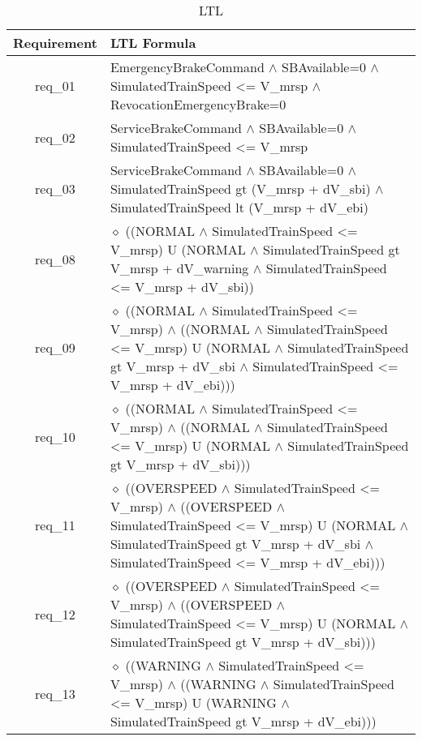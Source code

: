 \begin{table}[ht!]
\footnotesize
	\caption{LTL}
	\begin{center}
    \begin{tabular}{|c|p{10cm}|}
    \hline
	Requirement & LTL Formula \\
	\hline
	\hline
	req\_01 & EmergencyBrakeCommand $\wedge$ SBAvailable=0 $\wedge$ SimulatedTrainSpeed <= V\_mrsp $\wedge$  RevocationEmergencyBrake=0\\
	\hline
	req\_02 & ServiceBrakeCommand $\wedge$ SBAvailable=0 $\wedge$ SimulatedTrainSpeed <= V\_mrsp\\
	\hline
	req\_03 & ServiceBrakeCommand $\wedge$ SBAvailable=0 $\wedge$ SimulatedTrainSpeed gt (V\_mrsp + dV\_sbi) $\wedge$ SimulatedTrainSpeed lt (V\_mrsp + dV\_ebi) \\
	\hline
	req\_08 &  $\diamond$ ((NORMAL	 $\wedge$ SimulatedTrainSpeed <= V\_mrsp) U (NORMAL $\wedge$ SimulatedTrainSpeed gt V\_mrsp + dV\_warning $\wedge$ SimulatedTrainSpeed <= V\_mrsp + dV\_sbi)) \\
	\hline
	req\_09 & $\diamond$ ((NORMAL $\wedge$ SimulatedTrainSpeed <= V\_mrsp) $\wedge$ ((NORMAL $\wedge$ SimulatedTrainSpeed <= V\_mrsp) U (NORMAL $\wedge$ SimulatedTrainSpeed gt V\_mrsp + dV\_sbi $\wedge$ SimulatedTrainSpeed <= V\_mrsp + dV\_ebi))) \\
	\hline
	req\_10 & $\diamond$ ((NORMAL $\wedge$ SimulatedTrainSpeed <= V\_mrsp) $\wedge$ ((NORMAL $\wedge$ SimulatedTrainSpeed <= V\_mrsp) U (NORMAL $\wedge$ SimulatedTrainSpeed gt V\_mrsp + dV\_sbi)))\\
	\hline
	req\_11 & $\diamond$ ((OVERSPEED $\wedge$ SimulatedTrainSpeed <= V\_mrsp) $\wedge$ ((OVERSPEED $\wedge$ SimulatedTrainSpeed <= V\_mrsp) U (NORMAL $\wedge$ SimulatedTrainSpeed gt V\_mrsp + dV\_sbi $\wedge$ SimulatedTrainSpeed <= V\_mrsp + dV\_ebi))) \\
	\hline
	req\_12 & $\diamond$ ((OVERSPEED $\wedge$ SimulatedTrainSpeed <= V\_mrsp) $\wedge$ ((OVERSPEED $\wedge$ SimulatedTrainSpeed <= V\_mrsp) U (NORMAL $\wedge$ SimulatedTrainSpeed gt V\_mrsp + dV\_sbi))) \\
	\hline
	req\_13 & $\diamond$ ((WARNING $\wedge$ SimulatedTrainSpeed <= V\_mrsp) $\wedge$ ((WARNING $\wedge$ SimulatedTrainSpeed <= V\_mrsp) U (WARNING $\wedge$ SimulatedTrainSpeed gt V\_mrsp + dV\_ebi))) \\
	\hline
    \end{tabular}
    \end{center}
\label{tab:reqltl}
\end{table} 


